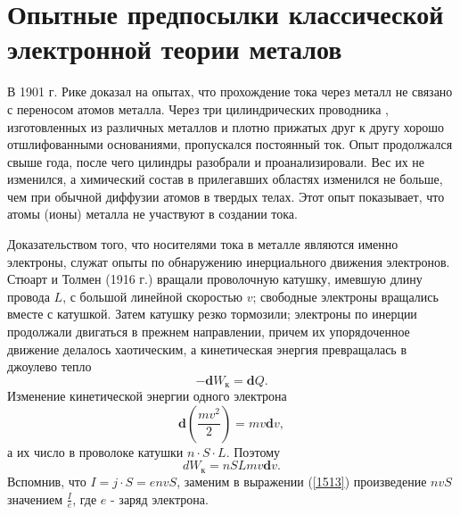 \documentclass[a4paper,10pt]{book}
\begin{document}
\section{Опытные предпосылки классической электронной теории металов}
В 1901 г. Рике доказал на опытах, что прохождение тока через металл не связано с переносом атомов металла. Через три цилиндрических проводника
, изготовленных из различных металлов и плотно прижатых друг к другу хорошо отшлифованными основаниями, пропускался постоянный ток. Опыт продолжался
свыше года, после чего цилиндры разобрали и проанализировали. Вес их не изменился, а химический состав в прилегавших областях изменился не больше, чем 
при обычной диффузии атомов в твердых телах. Этот опыт показывает, что атомы (ионы) металла не участвуют в создании тока.

Доказательством того, что носителями тока в металле являются именно электроны, служат опыты по обнаружению инерциального движения электронов.
Стюарт и Толмен (1916 г.) вращали проволочную катушку, имевшую длину провода $L$, с большой линейной скоростью $v$; свободные электроны вращались
вместе с катушкой. Затем катушку резко тормозили; электроны по инерции продолжали двигаться в прежнем направлении, причем их упорядоченное движение
делалось хаотическим, а кинетическая энергия превращалась в джоулево тепло
\begin{equation}\label{1511}
 -\mathbf{d}W_\text{к} = \mathbf{d}Q.
\end{equation}
Изменение кинетической энергии одного электрона
\begin{equation}\label{1512}
 \mathbf{d}(\frac{mv^2}{2}) = mv\mathbf{d}v,
\end{equation}
а их число в проволоке катушки $n\cdot S\cdot L$. Поэтому 
\begin{equation}\label{1513}
 dW_\text{к} = nSLmv\mathbf{d}v.
\end{equation}
Вспомнив, что $I = j \cdot S = envS$, заменим в выражении (\ref{1513}) произведение $nvS$ значением $\frac{I}{e}$, где $e$ - заряд электрона.
\end{document}
